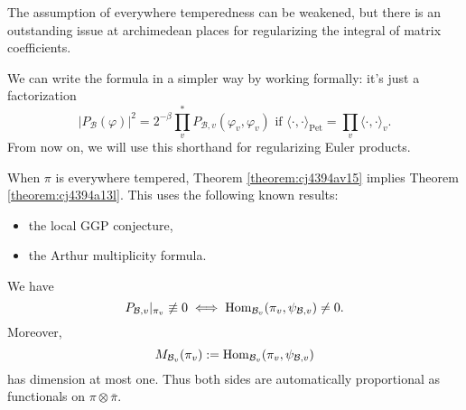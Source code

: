 \documentclass[reqno]{amsart} 
\begin{document}
\begin{remark}\label{remark:cj4460nohy}
The assumption of everywhere temperedness can be weakened, but there is an outstanding issue at archimedean places for regularizing the integral of matrix coefficients.
\end{remark}

\begin{remark}\label{remark:cj4460nm8g}
  We can write the formula in a simpler way by working formally: it's just a factorization
  \begin{equation*}
    \left\lvert P_{\mathcal{B} } (\varphi)  \right\rvert^2 = 2^{- \beta}
    \prod_{v}^\ast  P_{\mathcal{B}, v} (\varphi_v, \varphi_v )
    \text{ if }
    \langle \cdot, \cdot  \rangle_{\mathrm{Pet}} = \prod_v \langle  \cdot, \cdot  \rangle_v.
  \end{equation*}
  From now on, we will use this shorthand for regularizing Euler products.
\end{remark}
\begin{remark}\label{remark:cj4460nl4f}
  When $\pi$ is everywhere tempered, Theorem \ref{theorem:cj4394av15} implies Theorem \ref{theorem:cj4394a13l}.  This uses the following known results:
  \begin{itemize}
  \item the local GGP conjecture,
  \item the Arthur multiplicity formula.
  \end{itemize}
\end{remark}
\begin{remark}\label{remark:cj4460nkmv}
  We have
  \begin{equation*}
    P_{\mathcal{B}, v} |_{\pi_v } \not \equiv 0
    \iff
    \operatorname{Hom}_{\mathcal{B}_v } (\pi_v, \psi_{\mathcal{B}, v}) \neq 0.
  \end{equation*}
  Moreover,
  \begin{equation*}
    M_{\mathcal{B}_v }(\pi_v ) := \operatorname{Hom}_{\mathcal{B}_v } (\pi_v, \psi_{\mathcal{B}, v}) 
  \end{equation*}
  has dimension at most one.  Thus both sides are automatically proportional as functionals on $\pi \otimes \bar{\pi }$.
\end{remark}
\end{document}
